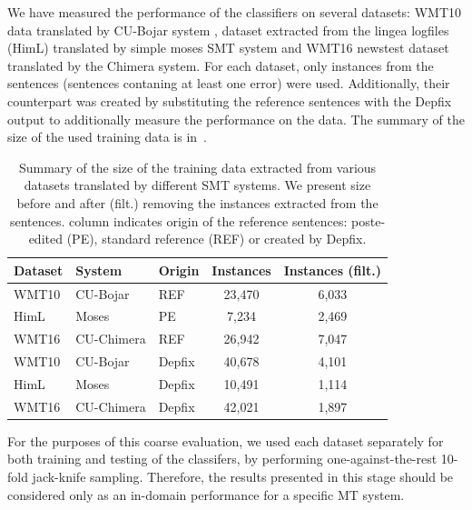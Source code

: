 We have measured the performance of the classifiers on several datasets:
WMT10 data translated by CU-Bojar system \citep{biblio:BoJaProbesin2012},
dataset extracted from the lingea logfiles (HimL) translated by simple moses SMT system \citep{Koehn:2007:MOS:1557769.1557821} and
WMT16 newstest dataset translated by the Chimera system.
For each dataset, only instances from the  sentences (sentences contaning at least one error)
were used.
Additionally, their counterpart was
created by substituting the reference sentences with the Depfix output
to additionally measure the performance on the  data.
The summary of the size of the used training data is in~.

\begin{table}[t]
\centering
\small

\begin{tabular}{lll|cc}
Dataset  &  System  & Origin  &  \hash{} Instances  &  \hash{} Instances (filt.)  \\
\hline
WMT10  &  CU-Bojar  &  REF  &  23,470  &  6,033  \\
HimL  &  Moses  &  PE  & 7,234  &  2,469  \\
WMT16  &  CU-Chimera  &  REF  &  26,942  &  7,047  \\
WMT10  &  CU-Bojar  &  Depfix  &  40,678  &  4,101  \\
HimL  &  Moses  &  Depfix  &  10,491  &  1,114  \\
WMT16  &  CU-Chimera  &  Depfix  &  42,021  &  1,897  \\
\end{tabular}
\caption[Summary of the extracted Czech training data for error detection]{
    Summary of the size of the training data extracted from various datasets translated by different SMT systems. We present
size before and after (filt.) removing the instances extracted from the  sentences.
 column indicates origin
of the reference sentences: poste-edited (PE), standard reference (REF) or created by Depfix.
}
\label{wf-training-sum}
\end{table}


For the purposes of this coarse evaluation, we used each dataset separately for both training
and testing of the classifers, by performing one-against-the-rest 10-fold jack-knife sampling.
Therefore, the results presented in this stage should be considered only as an in-domain
performance for a specific MT system.

